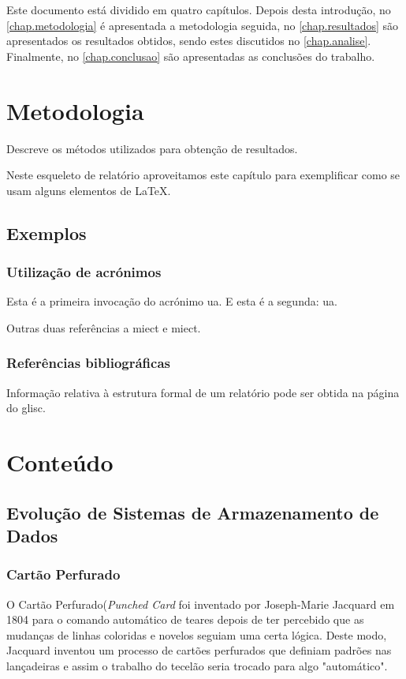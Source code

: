 \documentclass{report}
\begin{document}
Este documento está dividido em quatro capítulos.
Depois desta introdução,
no \autoref{chap.metodologia} é apresentada a metodologia seguida,
no \autoref{chap.resultados} são apresentados os resultados obtidos,
sendo estes discutidos no \autoref{chap.analise}.
Finalmente, no \autoref{chap.conclusao} são apresentadas
as conclusões do trabalho.

\chapter{Metodologia}
\label{chap.metodologia}
Descreve os métodos utilizados para obtenção de resultados.

Neste esqueleto de relatório aproveitamos este capítulo para exemplificar
como se usam alguns elementos de {\LaTeX}.

\section{Exemplos}

\subsection{Utilização de acrónimos}
Esta é a primeira invocação do acrónimo \ac{ua}.
E esta é a segunda: \ac{ua}.

Outras duas referências a \ac{miect}
e \ac{miect}.

\subsection{Referências bibliográficas}
Informação relativa à estrutura formal de um relatório pode ser obtida
na página do \ac{glisc}\cite{glisc}.

\newpage
\chapter{Conteúdo}
\label{chap.conteúdo}
	\section{Evolução de Sistemas de Armazenamento de Dados}
		\subsection{Cartão Perfurado}
		O Cartão Perfurado(\textit{Punched Card} foi inventado por Joseph-Marie Jacquard em 1804 para o comando automático de teares depois de ter percebido que as mudanças de linhas coloridas e novelos  seguiam uma certa lógica. Deste modo, Jacquard inventou um processo de cartões perfurados que definiam padrões nas lançadeiras e assim o trabalho do tecelão seria trocado para algo "automático". 
		
\end{document}
